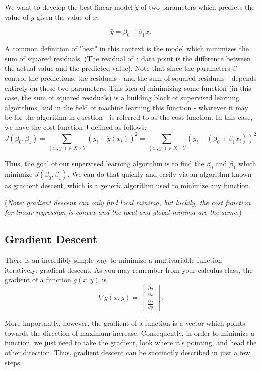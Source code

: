 \documentclass[a4paper]{article}
\begin{document}
We want to develop the best linear model \(\hat{y}\) of two parameters which predicts the value of \(y\) given the value of \(x\):

\[\hat{y} = \beta_0+ \beta_1 x.\]

A common definition of "best" in this context is the model which minimizes the sum of squared residuals. (The residual of a data point is the difference between the actual value and the predicted value). Note that since the parameters \(\beta\) control the predictions, the residuals - and the sum of squared residuals - depends entirely on these two parameters. This idea of minimizing some function (in this case, the sum of squared residuals) is a building block of supervised learning algorithms, and in the field of machine learning this function - whatever it may be for the algorithm in question - is referred to as the cost function. In this case, we have the cost function J defined as follows:\[J(\beta_0, \beta_1)  = \sum_{(x_i, y_i) \in X\times Y} (y_i - \hat{y}(x_i))^2 = \sum_{(x_i, y_i) \in X\times Y} \left(y_i - (\beta_0 + \beta_1 x_i)\right)^2\]

Thus, the goal of our supervised learning algorithm is to find the \(\beta_0\) and \(\beta_1\) which minimize \(J(\beta_0, \beta_1)\). We can do that quickly and easily via an algorithm known as gradient descent, which is a generic algorithm used to minimize any function.

(\emph{Note: gradient descent can only find local minima, but luckily, the cost function for linear
regression is convex and the local and global minima are the same.})

\subsection*{Gradient Descent}

There is an incredibly simple way to minimize a multivariable function iteratively: gradient
descent. As you may remember from your calculus class, the gradient of a function $g(x, y)$ is
\[\nabla g(x, y) = \begin{bmatrix} \frac{\partial g}{\partial x} \\ \frac{\partial g}{\partial
    y}\end{bmatrix}.\]

More importantly, however, the gradient of a function is a vector which points towards the direction
of maximum increase. Consequently, in order to minimize a function, we just need to take the
gradient, look where it's pointing, and head the other direction. Thus, gradient descent can be
succinctly described in just a few steps:
\end{document}
